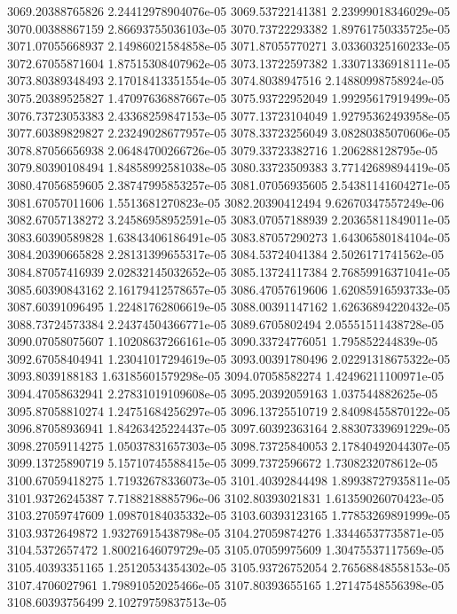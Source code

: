 {3069.20388765826 2.24412978904076e-05
3069.53722141381 2.23999018346029e-05
3070.00388867159 2.86693755036103e-05
3070.73722293382 1.89761750335725e-05
3071.07055668937 2.14986021584858e-05
3071.87055770271 3.03360325160233e-05
3072.67055871604 1.87515308407962e-05
3073.13722597382 1.33071336918111e-05
3073.80389348493 2.17018413351554e-05
3074.8038947516 2.14880998758924e-05
3075.20389525827 1.47097636887667e-05
3075.93722952049 1.99295617919499e-05
3076.73723053383 2.43368259847153e-05
3077.13723104049 1.92795362493958e-05
3077.60389829827 2.23249028677957e-05
3078.33723256049 3.08280385070606e-05
3078.87056656938 2.06484700266726e-05
3079.33723382716 1.206288128795e-05
3079.80390108494 1.84858992581038e-05
3080.33723509383 3.77142689894419e-05
3080.47056859605 2.38747995853257e-05
3081.07056935605 2.54381141604271e-05
3081.67057011606 1.5513681270823e-05
3082.20390412494 9.62670347557249e-06
3082.67057138272 3.24586958952591e-05
3083.07057188939 2.20365811849011e-05
3083.60390589828 1.63843406186491e-05
3083.87057290273 1.64306580184104e-05
3084.20390665828 2.28131399655317e-05
3084.53724041384 2.5026171741562e-05
3084.87057416939 2.02832145032652e-05
3085.13724117384 2.76859916371041e-05
3085.60390843162 2.16179412578657e-05
3086.47057619606 1.62085916593733e-05
3087.60391096495 1.22481762806619e-05
3088.00391147162 1.62636894220432e-05
3088.73724573384 2.24374504366771e-05
3089.6705802494 2.05551511438728e-05
3090.07058075607 1.10208637266161e-05
3090.33724776051 1.795852244839e-05
3092.67058404941 1.23041017294619e-05
3093.00391780496 2.02291318675322e-05
3093.8039188183 1.63185601579298e-05
3094.07058582274 1.42496211100971e-05
3094.47058632941 2.27831019109608e-05
3095.20392059163 1.037544882625e-05
3095.87058810274 1.24751684256297e-05
3096.13725510719 2.84098455870122e-05
3096.87058936941 1.84263425224437e-05
3097.60392363164 2.88307339691229e-05
3098.27059114275 1.05037831657303e-05
3098.73725840053 2.17840492044307e-05
3099.13725890719 5.15710745588415e-05
3099.7372596672 1.7308232078612e-05
3100.67059418275 1.71932678336073e-05
3101.40392844498 1.89938727935811e-05
3101.93726245387 7.7188218885796e-06
3102.80393021831 1.61359026070423e-05
3103.27059747609 1.09870184035332e-05
3103.60393123165 1.77853269891999e-05
3103.9372649872 1.93276915438798e-05
3104.27059874276 1.33446537735871e-05
3104.5372657472 1.80021646079729e-05
3105.07059975609 1.30475537117569e-05
3105.40393351165 1.25120534354302e-05
3105.93726752054 2.76568848558153e-05
3107.4706027961 1.79891052025466e-05
3107.80393655165 1.27147548556398e-05
3108.60393756499 2.10279759837513e-05
}
